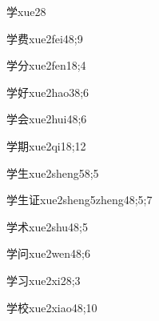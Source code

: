 \begin{verbete}{学}{xue2}{8}
\end{verbete}

\begin{verbete}{学费}{xue2fei4}{8;9}
\end{verbete}

\begin{verbete}{学分}{xue2fen1}{8;4}
\end{verbete}

\begin{verbete}{学好}{xue2hao3}{8;6}
\end{verbete}

\begin{verbete}{学会}{xue2hui4}{8;6}
\end{verbete}

\begin{verbete}{学期}{xue2qi1}{8;12}
\end{verbete}

\begin{verbete}{学生}{xue2sheng5}{8;5}
\end{verbete}

\begin{verbete}{学生证}{xue2sheng5zheng4}{8;5;7}
\end{verbete}

\begin{verbete}{学术}{xue2shu4}{8;5}
\end{verbete}

\begin{verbete}{学问}{xue2wen4}{8;6}
\end{verbete}

\begin{verbete}{学习}{xue2xi2}{8;3}
\end{verbete}

\begin{verbete}{学校}{xue2xiao4}{8;10}
\end{verbete}

